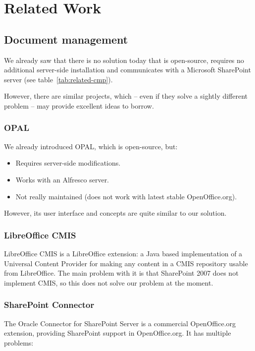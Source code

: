 \chapter{Related Work}

\section{Document management}

We already saw that there is no solution today that is open-source, requires no
additional server-side installation and communicates with a Microsoft
SharePoint server (see table~\ref{tab:related-cmp}).

However, there are similar projects, which -- even if they
solve a sightly different problem -- may provide excellent ideas to borrow.

\subsection*{OPAL}
We already introduced OPAL, which is open-source, but:

\begin{itemize}
\item Requires server-side modifications.
\item Works with an Alfresco server.
\item Not really maintained (does not work with latest stable OpenOffice.org).
\end{itemize}

However, its user interface and concepts are quite similar to our solution.

\subsection*{LibreOffice CMIS}
LibreOffice CMIS\cite{locmis} is a LibreOffice extension: a Java based
implementation of a Universal Content Provider for making any content in a CMIS
repository usable from LibreOffice. The main problem with it is that SharePoint
2007 does not implement CMIS, so this does not solve our problem at the moment.

\subsection*{SharePoint Connector}
The Oracle Connector for SharePoint Server\cite{oracle-sp-connector} is a
commercial OpenOffice.org extension, providing SharePoint support in
OpenOffice.org. It has multiple problems:


